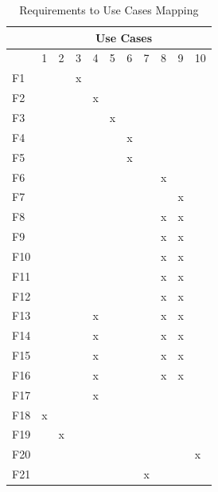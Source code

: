 \begin{table}[hbt!]
    \centering
    \captionsetup{justification=centering}
    \begin{tabular}{|l|l|l|l|l|l|l|l|l|l|l|}
        \hline
        & \multicolumn{10}{c|}{\textbf{Use Cases}} \\ \hline
        & 1 & 2 & 3 & 4 & 5 & 6 & 7 & 8 & 9 & 10 \\ \hline
        F1  &   &   & x &   &   &   &   &   &   &    \\ \hline
        F2  &   &   &   & x &   &   &   &   &   &    \\ \hline
        F3  &   &   &   &   & x &   &   &   &   &    \\ \hline
        F4  &   &   &   &   &   & x &   &   &   &    \\ \hline
        F5  &   &   &   &   &   & x &   &   &   &    \\ \hline
        F6  &   &   &   &   &   &   &   & x &   &    \\ \hline
        F7  &   &   &   &   &   &   &   &   & x &    \\ \hline
        F8  &   &   &   &   &   &   &   & x & x &    \\ \hline
        F9  &   &   &   &   &   &   &   & x & x &    \\ \hline
        F10 &   &   &   &   &   &   &   & x & x &    \\ \hline
        F11 &   &   &   &   &   &   &   & x & x &    \\ \hline
        F12 &   &   &   &   &   &   &   & x & x &    \\ \hline
        F13 &   &   &   & x &   &   &   & x & x &    \\ \hline
        F14 &   &   &   & x &   &   &   & x & x &    \\ \hline
        F15 &   &   &   & x &   &   &   & x & x &    \\ \hline
        F16 &   &   &   & x &   &   &   & x & x &    \\ \hline
        F17 &   &   &   & x &   &   &   &   &   &    \\ \hline
        F18 & x &   &   &   &   &   &   &   &   &    \\ \hline
        F19 &   & x &   &   &   &   &   &   &   &    \\ \hline
        F20 &   &   &   &   &   &   &   &   &   & x  \\ \hline
        F21 &   &   &   &   &   &   & x &   &   &    \\ \hline
    \end{tabular}%
    \caption{Requirements to Use Cases Mapping}
    \label{tab:use_cases}
\end{table}